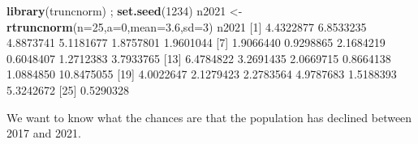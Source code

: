 \documentclass[
]{book}
\newenvironment{Shaded}{\begin{snugshade}}{\end{snugshade}}
\newcommand{\DataTypeTok}[1]{\textcolor[rgb]{0.13,0.29,0.53}{#1}}
\newcommand{\DecValTok}[1]{\textcolor[rgb]{0.00,0.00,0.81}{#1}}
\newcommand{\FloatTok}[1]{\textcolor[rgb]{0.00,0.00,0.81}{#1}}
\newcommand{\KeywordTok}[1]{\textcolor[rgb]{0.13,0.29,0.53}{\textbf{#1}}}
\newcommand{\NormalTok}[1]{#1}
\newcommand{\OperatorTok}[1]{\textcolor[rgb]{0.81,0.36,0.00}{\textbf{#1}}}
\newcommand{\StringTok}[1]{\textcolor[rgb]{0.31,0.60,0.02}{#1}}
\begin{document}
\begin{Shaded}
\begin{Highlighting}[]
\KeywordTok{library}\NormalTok{(truncnorm) ; }\KeywordTok{set.seed}\NormalTok{(}\DecValTok{1234}\NormalTok{)}
\NormalTok{n2021 <-}\StringTok{ }\KeywordTok{rtruncnorm}\NormalTok{(}\DataTypeTok{n=}\DecValTok{25}\NormalTok{,}\DataTypeTok{a=}\DecValTok{0}\NormalTok{,}\DataTypeTok{mean=}\FloatTok{3.6}\NormalTok{,}\DataTypeTok{sd=}\DecValTok{3}\NormalTok{)}
\NormalTok{n2021}
\NormalTok{ [}\DecValTok{1}\NormalTok{]  }\FloatTok{4.4322877}  \FloatTok{6.8533235}  \FloatTok{4.8873741}  \FloatTok{5.1181677}  \FloatTok{1.8757801}  \FloatTok{1.9601044}
\NormalTok{ [}\DecValTok{7}\NormalTok{]  }\FloatTok{1.9066440}  \FloatTok{0.9298865}  \FloatTok{2.1684219}  \FloatTok{0.6048407}  \FloatTok{1.2712383}  \FloatTok{3.7933765}
\NormalTok{[}\DecValTok{13}\NormalTok{]  }\FloatTok{6.4784822}  \FloatTok{3.2691435}  \FloatTok{2.0669715}  \FloatTok{0.8664138}  \FloatTok{1.0884850} \FloatTok{10.8475055}
\NormalTok{[}\DecValTok{19}\NormalTok{]  }\FloatTok{4.0022647}  \FloatTok{2.1279423}  \FloatTok{2.2783564}  \FloatTok{4.9787683}  \FloatTok{1.5188393}  \FloatTok{5.3242672}
\NormalTok{[}\DecValTok{25}\NormalTok{]  }\FloatTok{0.5290328}
\end{Highlighting}
\end{Shaded}

We want to know what the chances are that the population has declined between 2017 and 2021.

\begin{Shaded}
\end{Shaded}
\end{document}
